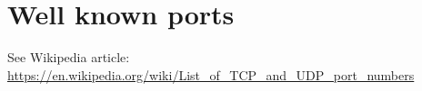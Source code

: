\section{Well known ports}
See Wikipedia article: \url{https://en.wikipedia.org/wiki/List_of_TCP_and_UDP_port_numbers}
